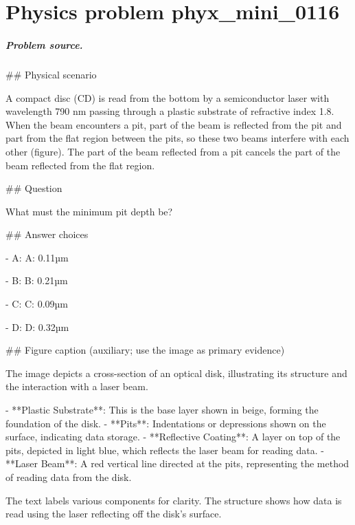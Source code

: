 
\chapter{Physics problem phyx\_mini\_0116}
\label{ch:PhyXMiniProblems_problem_phyx_mini_0116}

\paragraph{Problem source.}
\#\# Physical scenario

A compact disc (CD) is read from the bottom by a semiconductor laser with wavelength 790 nm passing through a plastic substrate of refractive index 1.8. When the beam encounters a pit, part of the beam is reflected from the pit and part from the flat region between the pits, so these two beams interfere with each other (figure). The part of the beam reflected from a pit cancels the part of the beam reflected from the flat region.

\#\# Question

What must the minimum pit depth be?

\#\# Answer choices

- A: A: 0.11µm

- B: B: 0.21µm

- C: C: 0.09µm

- D: D: 0.32µm

\#\# Figure caption (auxiliary; use the image as primary evidence)

The image depicts a cross-section of an optical disk, illustrating its structure and the interaction with a laser beam. 

- **Plastic Substrate**: This is the base layer shown in beige, forming the foundation of the disk.
- **Pits**: Indentations or depressions shown on the surface, indicating data storage.
- **Reflective Coating**: A layer on top of the pits, depicted in light blue, which reflects the laser beam for reading data.
- **Laser Beam**: A red vertical line directed at the pits, representing the method of reading data from the disk.

The text labels various components for clarity. The structure shows how data is read using the laser reflecting off the disk's surface.

